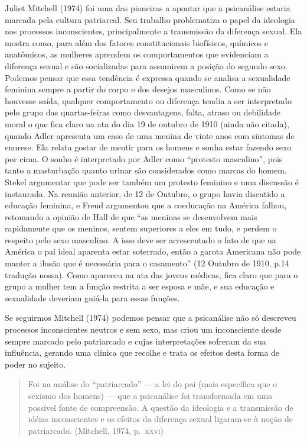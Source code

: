 Juliet Mitchell (1974) foi uma das pioneiras a apontar que a psicanálise
estaria marcada pela cultura patriarcal. Seu trabalho problematiza o
papel da ideologia nos processos inconscientes, principalmente a
transmissão da diferença sexual. Ela mostra como, para além dos fatores
constitucionais biofísicos, químicos e anatômicos, as mulheres aprendem
os comportamentos que evidenciam a diferença sexual e são socializadas
para assumirem a posição do segundo sexo. Podemos pensar que essa
tendência é expressa quando se analisa a sexualidade feminina sempre a
partir do corpo e dos desejos masculinos. Como se não houvesse saída,
qualquer comportamento ou diferença tendia a ser interpretado pelo grupo
das quartas-feiras como desvantagens, falta, atraso ou debilidade moral
o que fica claro na ata do dia 19 de outubro de 1910 (ainda não citada),
quando Adler apresenta um caso de uma menina de vinte anos com sintomas
de enurese. Ela relata gostar de mentir para os homens e sonha estar
fazendo sexo por cima. O sonho é interpretado por Adler como ``protesto
masculino'', pois tanto a masturbação quanto urinar são considerados como
marcas do homem. Stekel argumentar que pode ser também um protesto
feminino e uma discussão é instaurada. Na reunião anterior, de 12 de
Outubro, o grupo havia discutido a educação feminina, e Freud argumentou
que a coeducação na América falhou, retomando a opinião de Hall de que
``as meninas se desenvolvem mais rapidamente que os meninos, sentem
 superiores a eles em tudo, e perdem o respeito pelo sexo masculino. A
 isso deve ser acrescentado o fato de que na América o pai ideal aparenta
 estar soterrado, então a garota Americana não pode manter a ilusão que é
 necessária para o casamento'' (12 Outubro de 1910, p.14 tradução nossa).
Como apareceu na ata das jovens médicas, fica claro que para o grupo a
mulher tem a função restrita a ser esposa e mãe, e sua educação e
sexualidade deveriam guiá-la para essas funções.

Se seguirmos Mitchell (1974) podemos pensar que a psicanálise não só
descreveu processos inconscientes neutros e sem sexo, mas criou um
inconsciente desde sempre marcado pelo patriarcado e cujas
interpretações sofreram da sua influência, gerando uma clínica que
recolhe e trata os efeitos desta forma de poder no sujeito.

\begin{quote}
Foi na análise do ``patriarcado'' --- a lei do pai (mais específica que o
sexismo dos homens) --- que a psicanálise foi transformada em uma
possível fonte de compreensão. A questão da ideologia e a transmissão de
idéias inconscientes e os efeitos da diferença sexual ligaram-se à noção
de patriarcado. (Mitchell, 1974, p.~\textsc{xxvi})
\end{quote}

